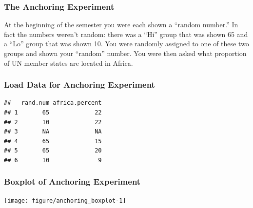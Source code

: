 \begin{frame}
\frametitle{The Anchoring Experiment}
At the beginning of the semester you were each shown a ``random number.'' In fact the numbers weren't random: there was a ``Hi'' group that was shown 65 and a ``Lo'' group that was shown 10. You were randomly assigned to one of these two groups and shown your ``random'' number. You were then asked what proportion of UN member states are located in Africa.  


\end{frame}
\begin{frame}[fragile]\frametitle{Load Data for Anchoring Experiment}
\footnotesize
\begin{knitrout}
\color{fgcolor}\begin{kframe}
\begin{alltt}
 \hlkwb{<-} 
 \hlkwb{<-} 
 \hlkwb{<-} \hlstd{survey[,}\hlstd{(}\hlstd{,} \hlstd{)]}
\end{alltt}
\begin{verbatim}
##   rand.num africa.percent
## 1       65             22
## 2       10             22
## 3       NA             NA
## 4       65             15
## 5       65             20
## 6       10              9
\end{verbatim}
\end{kframe}
\end{knitrout}

\end{frame}
\begin{frame}[t,fragile]\frametitle{Boxplot of Anchoring Experiment}
  \footnotesize
\begin{knitrout}
\color{fgcolor}\begin{kframe}
\begin{alltt}
 \hlopt{~}   
\end{alltt}
\end{kframe}

{\centering \texttt{[image: figure/anchoring\_boxplot-1]} 

}



\end{knitrout}
\end{frame}

